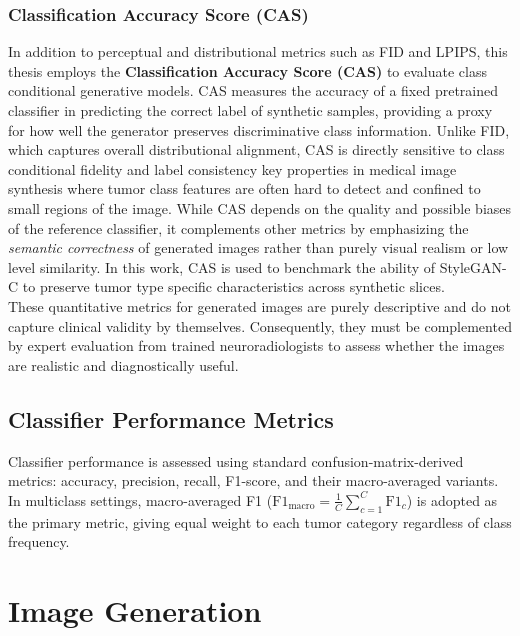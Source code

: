\subsubsection{Classification Accuracy Score (CAS)}

In addition to perceptual and distributional metrics such as FID and LPIPS, this thesis employs the \textbf{Classification Accuracy Score (CAS)} \cite{ravuri2019classificationaccuracyscoreconditional} to evaluate class conditional generative models. CAS measures the accuracy of a fixed pretrained classifier in predicting the correct label of synthetic samples, providing a proxy for how well the generator preserves discriminative class information. Unlike FID, which captures overall distributional alignment, CAS is directly sensitive to class conditional fidelity and label consistency key properties in medical image synthesis where tumor class features are often hard to detect and confined to small regions of the image. While CAS depends on the quality and possible biases of the reference classifier, it complements other metrics by emphasizing the \emph{semantic correctness} of generated images rather than purely visual realism or low level similarity. In this work, CAS is used to benchmark the ability of StyleGAN-C to preserve tumor type specific characteristics across synthetic slices.\\

These quantitative metrics for generated images are purely descriptive and do not capture clinical validity by themselves. Consequently, they must be complemented by expert evaluation from trained neuroradiologists to assess whether the images are realistic and diagnostically useful.

\subsection{Classifier Performance Metrics}

Classifier performance is assessed using standard confusion-matrix-derived metrics: accuracy, precision, recall, F1-score, and their macro-averaged variants. In multiclass settings, macro-averaged F1 ($\mathrm{F1}_{\mathrm{macro}} = \frac{1}{C}\sum_{c=1}^{C} \mathrm{F1}_c$) is adopted as the primary metric, giving equal weight to each tumor category regardless of class frequency.


\section{Image Generation}

